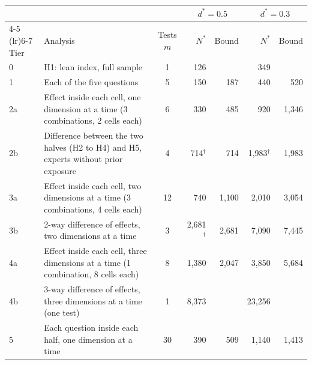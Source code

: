 \begin{tabularx}{\textwidth}{l X c rr rr}
\toprule
 & & & \multicolumn{2}{c}{$d^{*} = 0.5$} & \multicolumn{2}{c}{$d^{*} = 0.3$} \\
\cmidrule(lr){4-5} \cmidrule(lr){6-7}
Tier & Analysis & Tests $m$ & $N^{*}$ & Bound & $N^{*}$ & Bound \\
\midrule
0 & H1: lean index, full sample & 1 & 126 &  & 349 &  \\
1 & Each of the five questions & 5 & 150 & 187 & 440 & 520 \\
2a & Effect inside each cell, one dimension at a time (3 combinations, 2 cells each) & 6 & 330 & 485 & 920 & 1,346 \\
2b & Difference between the two halves (H2 to H4) and H5, experts without prior exposure & 4 & 714$^{\dagger}$ & 714 & 1,983$^{\dagger}$ & 1,983 \\
3a & Effect inside each cell, two dimensions at a time (3 combinations, 4 cells each) & 12 & 740 & 1,100 & 2,010 & 3,054 \\
3b & 2-way difference of effects, two dimensions at a time & 3 & 2,681$^{\dagger}$ & 2,681 & 7,090 & 7,445 \\
4a & Effect inside each cell, three dimensions at a time (1 combination, 8 cells each) & 8 & 1,380 & 2,047 & 3,850 & 5,684 \\
4b & 3-way difference of effects, three dimensions at a time (one test) & 1 & 8,373 &  & 23,256 &  \\
5 & Each question inside each half, one dimension at a time & 30 & 390 & 509 & 1,140 & 1,413 \\
\bottomrule
\end{tabularx}
